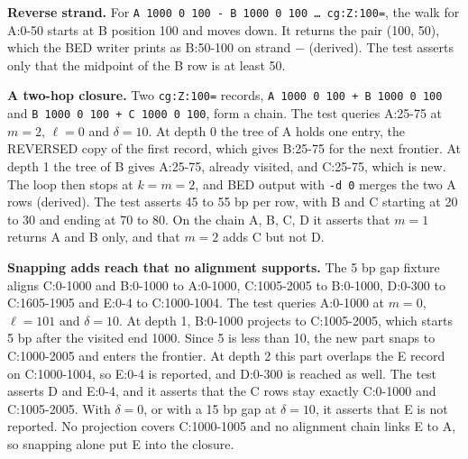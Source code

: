 \textbf{Reverse strand.}
For \texttt{A 1000 0 100 - B 1000 0 100 \dots{} cg:Z:100=}, the walk for A:0-50 starts at B position 100 and moves down.
It returns the pair (100, 50), which the BED writer prints as B:50-100 on strand $-$ (derived).
The test asserts only that the midpoint of the B row is at least 50.

\textbf{A two-hop closure.}
Two \texttt{cg:Z:100=} records, \texttt{A 1000 0 100 + B 1000 0 100} and \texttt{B 1000 0 100 + C 1000 0 100}, form a chain.
The test queries A:25-75 at $m=2$, $\ell=0$ and $\delta=10$.
At depth 0 the tree of A holds one entry, the REVERSED copy of the first record, which gives B:25-75 for the next frontier.
At depth 1 the tree of B gives A:25-75, already visited, and C:25-75, which is new.
The loop then stops at $k=m=2$, and BED output with \texttt{-d 0} merges the two A rows (derived).
The test asserts 45 to 55 bp per row, with B and C starting at 20 to 30 and ending at 70 to 80.
On the chain A, B, C, D it asserts that $m=1$ returns A and B only, and that $m=2$ adds C but not D.

\textbf{Snapping adds reach that no alignment supports.}
The 5 bp gap fixture aligns C:0-1000 and B:0-1000 to A:0-1000, C:1005-2005 to B:0-1000, D:0-300 to C:1605-1905 and E:0-4 to C:1000-1004.
The test queries A:0-1000 at $m=0$, $\ell=101$ and $\delta=10$.
At depth 1, B:0-1000 projects to C:1005-2005, which starts 5 bp after the visited end 1000.
Since 5 is less than 10, the new part snaps to C:1000-2005 and enters the frontier.
At depth 2 this part overlaps the E record on C:1000-1004, so E:0-4 is reported, and D:0-300 is reached as well.
The test asserts D and E:0-4, and it asserts that the C rows stay exactly C:0-1000 and C:1005-2005.
With $\delta=0$, or with a 15 bp gap at $\delta=10$, it asserts that E is not reported.
No projection covers C:1000-1005 and no alignment chain links E to A, so snapping alone put E into the closure.

